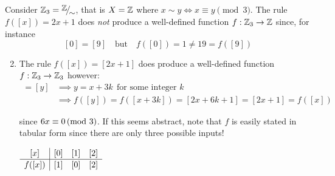 \begin{examples}{}{}
	\exstart Consider $\Z_3=\quotient\Z\sim$, that is $X=\mathbb{Z}$ where $x\sim y\Longleftrightarrow x\equiv y\pmod 3$. The rule $f([x])=2x+1$ does \emph{not} produce a well-defined function $f:\mathbb{Z}_3\to\mathbb{Z}$ since, for instance
	\[
		[0]=[9]\quad \text{but}\quad f([0])=1\neq 19 =f([9])  
	\]
	
	\begin{enumerate}\setcounter{enumi}{1}
	  \item The rule $f([x])=[2x+1]$ does produce a well-defined function $f:\mathbb{Z}_3\to\mathbb{Z}_3$ however:
	  \begin{align*}
	  	[x]=[y]
	  	&\implies y=x+3k\ \ \text{for some integer $k$}\\
	  	&\implies f([y])=f([x+3k]) =[2x+6k+1] =[2x+1] =f([x])
	  \end{align*}
	  \begin{minipage}[t]{0.72\linewidth}\vspace{-8pt}
	  	since $6x\equiv 0\negthickspace\pmod{3}$. If this seems abstract, note that $f$ is easily stated in tabular form since there are only three possible inputs!
	  \end{minipage}
	  \hfill
	  \begin{minipage}[t]{0.25\linewidth}\vspace{-10pt}
	  	\hfill $\def\arraystretch{1.1}
	  	\begin{array}{c|ccc}
	  		[x]&[0]&[1]&[2]\\\hline
	  		f([x])&[1]&[0]&[2]
	  	\end{array}$
	  \end{minipage}


\end{enumerate}
\end{examples}
